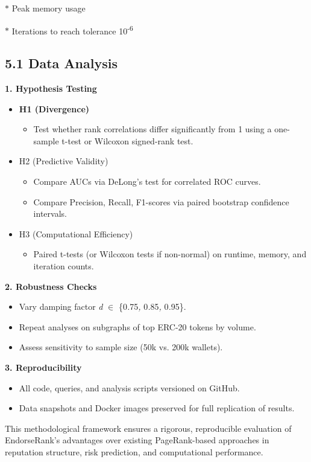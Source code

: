 \documentclass[12pt]{article}
\newcommand{\proposalSubheading}[1]{%
  \par\addvspace{0.38\baselineskip}%
  \noindent\textbf{#1}\par\nobreak\addvspace{0.08\baselineskip}%
}
\begin{document}
\(\ast\) Peak memory usage


\(\ast\) Iterations to reach tolerance 10\textsuperscript{-}\textsuperscript{6}


\subsection*{5.1 Data Analysis}
\label{sec:data-analysis}

\proposalSubheading{1. Hypothesis Testing}

\begin{itemize}
\item[\textbullet] \textbf{H1 (Divergence)}
\begin{itemize}
\item[\textendash] Test whether rank correlations differ significantly from 1 using a one- sample t-test or Wilcoxon signed-rank test.
\end{itemize}
\item[\textbullet] H2 (Predictive Validity)
\begin{itemize}
\item[\textendash] Compare AUCs via DeLong's test for correlated ROC curves.
\item[\textendash] Compare Precision, Recall, F1-scores via paired bootstrap confidence intervals.
\end{itemize}
\item[\textbullet] H3 (Computational Efficiency)
\begin{itemize}
\item[\textendash] Paired t-tests (or Wilcoxon tests if non-normal) on runtime, memory, and iteration counts.
\end{itemize}
\end{itemize}
\proposalSubheading{2. Robustness Checks}

\begin{itemize}
\item[\textbullet] Vary damping factor \emph{d }\(\in\) \{0\emph{.}75\emph{, }0\emph{.}85\emph{, }0\emph{.}95\}.
\item[\textbullet] Repeat analyses on subgraphs of top ERC-20 tokens by volume.
\item[\textbullet] Assess sensitivity to sample size (50k vs. 200k wallets).
\end{itemize}
\proposalSubheading{3. Reproducibility}

\begin{itemize}
\item[\textbullet] All code, queries, and analysis scripts versioned on GitHub.
\item[\textbullet] Data snapshots and Docker images preserved for full replication of results.
\end{itemize}
This methodological framework ensures a rigorous, reproducible evaluation of EndorseRank's advantages over existing PageRank-based approaches in reputation structure, risk prediction, and computational performance.
\end{document}
